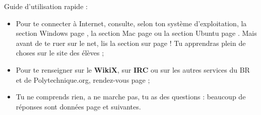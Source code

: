 Guide d'utilisation rapide :
\begin{itemize}
\item Pour te connecter à Internet, consulte, selon ton système d'exploitation, la section Windows page \pageref{windows}, la section Mac page \pageref{mac} ou la section Ubuntu page \pageref{ubuntu}. Mais avant de te ruer sur le net, lis la section sur \fkz page \pageref{services} ! Tu apprendras plein de choses sur le site des élèves ;
\item Pour te renseigner sur le \textbf{WikiX}, sur \textbf{IRC} ou sur les autres services du BR et de Polytechnique.org, rendez-vous page \pageref{services} ;
\item Tu ne comprends rien, a ne marche pas, tu as des questions : beaucoup de réponses sont données page \pageref{faq} et suivantes.

\end{itemize}
